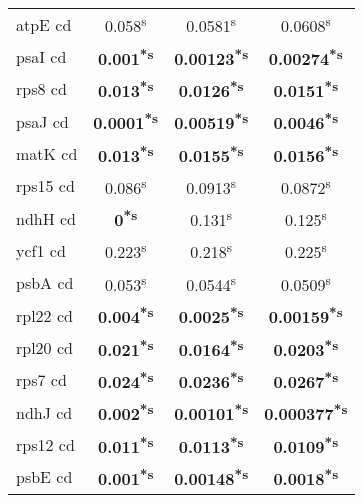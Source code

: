 \documentclass[a4paper]{article}
\begin{document}
\begin{longtable}{l|c|c|c}
atpE cd&0.058\textsuperscript{s}&0.0581\textsuperscript{s}&0.0608\textsuperscript{s}\\
psaI cd&\textbf{0.001\textsuperscript{*}\textsuperscript{s}}&\textbf{0.00123\textsuperscript{*}\textsuperscript{s}}&\textbf{0.00274\textsuperscript{*}\textsuperscript{s}}\\
rps8 cd&\textbf{0.013\textsuperscript{*}\textsuperscript{s}}&\textbf{0.0126\textsuperscript{*}\textsuperscript{s}}&\textbf{0.0151\textsuperscript{*}\textsuperscript{s}}\\
psaJ cd&\textbf{0.0001\textsuperscript{*}\textsuperscript{s}}&\textbf{0.00519\textsuperscript{*}\textsuperscript{s}}&\textbf{0.0046\textsuperscript{*}\textsuperscript{s}}\\
matK cd&\textbf{0.013\textsuperscript{*}\textsuperscript{s}}&\textbf{0.0155\textsuperscript{*}\textsuperscript{s}}&\textbf{0.0156\textsuperscript{*}\textsuperscript{s}}\\
rps15 cd&0.086\textsuperscript{s}&0.0913\textsuperscript{s}&0.0872\textsuperscript{s}\\
ndhH cd&\textbf{0\textsuperscript{*}\textsuperscript{s}}&0.131\textsuperscript{s}&0.125\textsuperscript{s}\\
ycf1 cd&0.223\textsuperscript{s}&0.218\textsuperscript{s}&0.225\textsuperscript{s}\\
psbA cd&0.053\textsuperscript{s}&0.0544\textsuperscript{s}&0.0509\textsuperscript{s}\\
rpl22 cd&\textbf{0.004\textsuperscript{*}\textsuperscript{s}}&\textbf{0.0025\textsuperscript{*}\textsuperscript{s}}&\textbf{0.00159\textsuperscript{*}\textsuperscript{s}}\\
rpl20 cd&\textbf{0.021\textsuperscript{*}\textsuperscript{s}}&\textbf{0.0164\textsuperscript{*}\textsuperscript{s}}&\textbf{0.0203\textsuperscript{*}\textsuperscript{s}}\\
rps7 cd&\textbf{0.024\textsuperscript{*}\textsuperscript{s}}&\textbf{0.0236\textsuperscript{*}\textsuperscript{s}}&\textbf{0.0267\textsuperscript{*}\textsuperscript{s}}\\
ndhJ cd&\textbf{0.002\textsuperscript{*}\textsuperscript{s}}&\textbf{0.00101\textsuperscript{*}\textsuperscript{s}}&\textbf{0.000377\textsuperscript{*}\textsuperscript{s}}\\
rps12 cd&\textbf{0.011\textsuperscript{*}\textsuperscript{s}}&\textbf{0.0113\textsuperscript{*}\textsuperscript{s}}&\textbf{0.0109\textsuperscript{*}\textsuperscript{s}}\\
psbE cd&\textbf{0.001\textsuperscript{*}\textsuperscript{s}}&\textbf{0.00148\textsuperscript{*}\textsuperscript{s}}&\textbf{0.0018\textsuperscript{*}\textsuperscript{s}}\\

\end{longtable}
\end{document}
